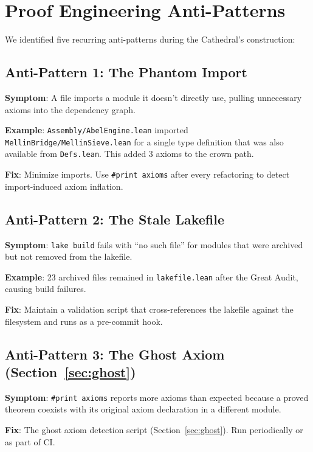 \documentclass[11pt,a4paper]{article}
\theoremstyle{definition}
\newcommand{\lean}[1]{\texttt{#1}}
\begin{document}
\section{Proof Engineering Anti-Patterns}
\label{sec:antipatterns}

We identified five recurring anti-patterns during the Cathedral's
construction:

\subsection{Anti-Pattern 1: The Phantom Import}

\textbf{Symptom}: A file imports a module it doesn't directly use,
pulling unnecessary axioms into the dependency graph.

\textbf{Example}: \lean{Assembly/AbelEngine.lean} imported
\lean{MellinBridge/MellinSieve.lean} for a single type definition
that was also available from \lean{Defs.lean}. This added 3 axioms
to the crown path.

\textbf{Fix}: Minimize imports. Use \lean{\#print axioms} after
every refactoring to detect import-induced axiom inflation.

\subsection{Anti-Pattern 2: The Stale Lakefile}

\textbf{Symptom}: \texttt{lake build} fails with ``no such file''
for modules that were archived but not removed from the lakefile.

\textbf{Example}: 23 archived files remained in \lean{lakefile.lean}
after the Great Audit, causing build failures.

\textbf{Fix}: Maintain a validation script that cross-references
the lakefile against the filesystem and runs as a pre-commit hook.

\subsection{Anti-Pattern 3: The Ghost Axiom (Section~\ref{sec:ghost})}

\textbf{Symptom}: \lean{\#print axioms} reports more axioms than
expected because a proved theorem coexists with its original axiom
declaration in a different module.

\textbf{Fix}: The ghost axiom detection script (Section~\ref{sec:ghost}).
Run periodically or as part of CI.
\end{document}
